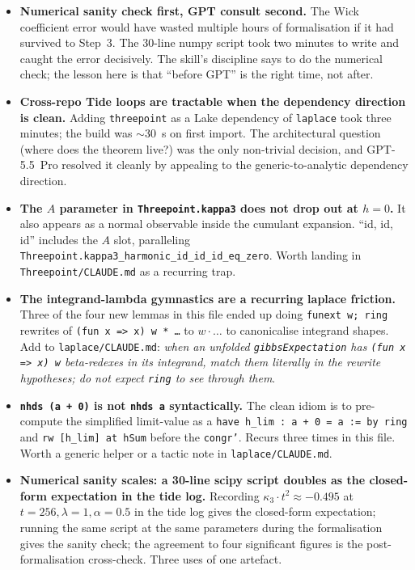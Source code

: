 \documentclass[11pt]{article}
\begin{document}
\begin{itemize}
\item \textbf{Numerical sanity check first, GPT consult second.} The
Wick coefficient error would have wasted multiple hours of formalisation
if it had survived to Step~3. The 30-line numpy script took two minutes
to write and caught the error decisively. The skill's discipline says
to do the numerical check; the lesson here is that ``before GPT'' is
the right time, not after.

\item \textbf{Cross-repo Tide loops are tractable when the dependency
direction is clean.} Adding \texttt{threepoint} as a Lake dependency
of \texttt{laplace} took three minutes; the build was $\sim$30~s on
first import. The architectural question (where does the theorem live?)
was the only non-trivial decision, and GPT-5.5~Pro resolved it cleanly
by appealing to the generic-to-analytic dependency direction.

\item \textbf{The $A$ parameter in \texttt{Threepoint.kappa3} does not
drop out at $h = 0$.} It also appears as a normal observable inside the
cumulant expansion. ``id, id, id'' includes the $A$ slot, paralleling
\texttt{Threepoint.kappa3\_harmonic\_id\_id\_id\_eq\_zero}. Worth
landing in \texttt{Threepoint/CLAUDE.md} as a recurring trap.

\item \textbf{The integrand-lambda gymnastics are a recurring laplace
friction.} Three of the four new lemmas in this file ended up doing
\texttt{funext w; ring} rewrites of \texttt{(fun x => x) w * \ldots} to
$w \cdot \ldots$ to canonicalise integrand shapes. Add to
\texttt{laplace/CLAUDE.md}: \emph{when an unfolded
\texttt{gibbsExpectation} has \texttt{(fun x => x) w} beta-redexes in
its integrand, match them literally in the rewrite hypotheses; do not
expect \texttt{ring} to see through them}.

\item \textbf{\texttt{nhds (a + 0)} is not \texttt{nhds a} syntactically.}
The clean idiom is to pre-compute the simplified limit-value as a
\texttt{have h\_lim : a + 0 = a := by ring} and \texttt{rw [h\_lim] at hSum}
before the \texttt{congr'}. Recurs three times in this file. Worth a
generic helper or a tactic note in \texttt{laplace/CLAUDE.md}.

\item \textbf{Numerical sanity scales: a 30-line scipy script doubles
as the closed-form expectation in the tide log.} Recording
$\kappa_3 \cdot t^2 \approx -0.495$ at $t = 256, \lambda = 1, \alpha = 0.5$
in the tide log gives the closed-form expectation; running the same
script at the same parameters during the formalisation gives the
sanity check; the agreement to four significant figures is the
post-formalisation cross-check. Three uses of one artefact.
\end{itemize}
\end{document}
